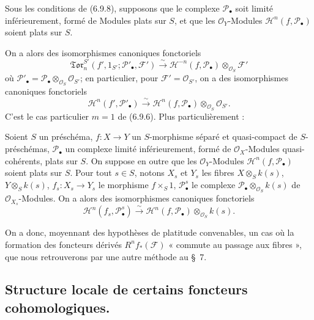 \begin{corollary}[6.9.9]
Sous les conditions de (6.9.8), supposons que le complexe
$\mathscr P_\bullet$ soit limité inférieurement, formé de Modules plats sur
$S$, et que les $\mathscr O_Y$-Modules
$\mathscr H^n(f,\mathscr P_\bullet)$ soient plats sur $S$.

On a alors des isomorphismes canoniques fonctoriels
\[
  \mathfrak{Tor}_n^{S'}
  (f',1_{S'};\mathscr P'_\bullet,\mathscr F')
  \xrightarrow{\sim}
  \mathscr H^{-n}(f,\mathscr P_\bullet)
  \otimes_{\mathscr O_S}\mathscr F'
  \tag{6.9.9.1}\label{III.6.9.9.1.fr}
\]
où
$\mathscr P'_\bullet=\mathscr P_\bullet\otimes_{\mathscr O_S}
\mathscr O_{S'}$; en particulier, pour $\mathscr F'=\mathscr O_{S'}$, on a
des isomorphismes canoniques fonctoriels
\[
  \mathscr H^n(f',\mathscr P'_\bullet)
  \xrightarrow{\sim}
  \mathscr H^n(f,\mathscr P_\bullet)
  \otimes_{\mathscr O_S}\mathscr O_{S'}.
  \tag{6.9.9.2}\label{III.6.9.9.2.fr}
\]
C'est le cas particulier $m=1$ de (6.9.6). Plus particulièrement :
\end{corollary}

\begin{corollary}[6.9.10]
Soient $S$ un préschéma, $f:X\to Y$ un $S$-morphisme séparé et
quasi-compact de $S$-préschémas, $\mathscr P_\bullet$ un complexe limité
inférieurement, formé de $\mathscr O_X$-Modules quasi-cohérents, plats sur
$S$. On suppose en outre que les $\mathscr O_Y$-Modules
$\mathscr H^n(f,\mathscr P_\bullet)$ soient plats sur $S$. Pour tout $s\in S$,
notons $X_s$ et $Y_s$ les fibres
$X\otimes_S k(s)$, $Y\otimes_S k(s)$,
$f_s:X_s\to Y_s$ le morphisme $f\times_S1$,
$\mathscr P_\bullet^s$ le complexe
$\mathscr P_\bullet\otimes_{\mathscr O_S}k(s)$ de
$\mathscr O_{X_s}$-Modules. On a alors des isomorphismes canoniques
fonctoriels
\[
  \mathscr H^n(f_s,\mathscr P_\bullet^s)
  \xrightarrow{\sim}
  \mathscr H^n(f,\mathscr P_\bullet)\otimes_{\mathscr O_S}k(s).
  \tag{6.9.10.1}\label{III.6.9.10.1.fr}
\]
\end{corollary}

On a donc, moyennant des hypothèses de platitude convenables, un cas où la
formation des foncteurs dérivés $R^nf_*(\mathscr F)$ « commute au passage aux
fibres », que nous retrouverons par une autre méthode au §~7.

\subsection{Structure locale de certains foncteurs cohomologiques.}


